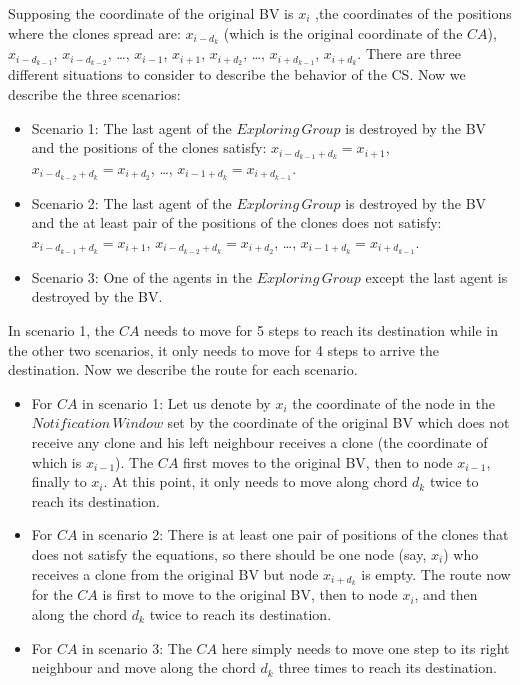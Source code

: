 Supposing the coordinate of the original BV is $x_i$ ,the coordinates of the positions where the clones spread are: $x_{i-d_k}$ (which is the original coordinate of the $CA$), $x_{i-d_{k-1}}$, $x_{i-d_{k-2}}$, \ldots, $x_{i-1}$, $x_{i+1}$, $x_{i+d_2}$, \ldots, $x_{i+d_{k-1}}$, $x_{i+d_{k}}$. There are three different situations to consider to describe the behavior of the CS.  
Now we describe the  three scenarios:
\begin{itemize}
\item Scenario 1: The last agent of the $Exploring\,Group$ is destroyed by the BV and the positions of the clones satisfy: $x_{i-d_{k-1}+d_{k}}=x_{i+1}$, $x_{i-d_{k-2}+d_{k}}=x_{i+d_2}$, \ldots, $x_{{i-1}+d_{k}}=x_{i+d_{k-1}}$. 
\item Scenario 2: The last agent of the $Exploring\,Group$ is destroyed by the BV and the at least   pair of the positions of the clones does not satisfy: $x_{i-d_{k-1}+d_{k}}=x_{i+1}$, $x_{i-d_{k-2}+d_{k}}=x_{i+d_2}$, \ldots, $x_{{i-1}+d_{k}}=x_{i+d_{k-1}}$. 
\item Scenario 3: One of the agents in the $Exploring\,Group$ except the last agent is destroyed by the BV.
\end{itemize}

In scenario 1, the $CA$ needs to move for 5 steps to reach its destination while in the other two scenarios, it only needs to move for 4 steps to arrive the destination. Now we describe the route for each scenario.
\begin{itemize}
\item For $CA$ in scenario 1: Let us denote by $x_i$ the coordinate of the node in the $Notification\,Window$ set by the coordinate of the original BV which does not receive any clone and his left neighbour receives a clone (the coordinate of which is $x_{i-1}$). The $CA$ first moves to the original BV, then to node $x_{i-1}$, finally to $x_i$. At this point, it only needs to move along   chord $d_k$   twice to reach its destination.
\item For $CA$ in scenario 2: There is at least one pair of   positions of the clones that does not satisfy the equations, so there should be one node (say, $x_i$) who receives a clone from the original BV but node $x_{i+d_k}$ is empty. The route now for the $CA$ is first to move to the original BV, then to node $x_i$, and then   along the chord $d_k$   twice to reach its destination.
\item For $CA$ in scenario 3: The $CA$ here simply needs to move   one step to its right neighbour and move along the chord $d_k$   three times to reach its destination.
\end{itemize}

